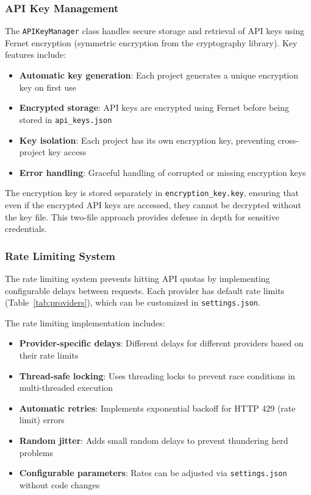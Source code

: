 \documentclass[11pt,a4paper]{article}
\begin{document}
\subsubsection{API Key Management}

The \texttt{APIKeyManager} class handles secure storage and retrieval of API keys using Fernet encryption (symmetric encryption from the cryptography library). Key features include:

\begin{itemize}
    \item \textbf{Automatic key generation}: Each project generates a unique encryption key on first use
    \item \textbf{Encrypted storage}: API keys are encrypted using Fernet before being stored in \texttt{api\_keys.json}
    \item \textbf{Key isolation}: Each project has its own encryption key, preventing cross-project key access
    \item \textbf{Error handling}: Graceful handling of corrupted or missing encryption keys
\end{itemize}

The encryption key is stored separately in \texttt{encryption\_key.key}, ensuring that even if the encrypted API keys are accessed, they cannot be decrypted without the key file. This two-file approach provides defense in depth for sensitive credentials.

\subsubsection{Rate Limiting System}

The rate limiting system prevents hitting API quotas by implementing configurable delays between requests. Each provider has default rate limits (Table~\ref{tab:providers}), which can be customized in \texttt{settings.json}.

The rate limiting implementation includes:
\begin{itemize}
    \item \textbf{Provider-specific delays}: Different delays for different providers based on their rate limits
    \item \textbf{Thread-safe locking}: Uses threading locks to prevent race conditions in multi-threaded execution
    \item \textbf{Automatic retries}: Implements exponential backoff for HTTP 429 (rate limit) errors
    \item \textbf{Random jitter}: Adds small random delays to prevent thundering herd problems
    \item \textbf{Configurable parameters}: Rates can be adjusted via \texttt{settings.json} without code changes
\end{itemize}
\end{document}
